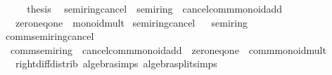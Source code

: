 \begin{isabellebody}
\ \ \isamarkupfalse%
\ \isamarkupfalse%
\ {\isacharquery}{\kern0pt}thesis\ \isacommand{{\isachardot}{\kern0pt}{\isachardot}{\kern0pt}}\isamarkupfalse%
\isanewline
{}\isamarkupfalse%
%
\endisatagproof
{\isafoldproof}%
%
\isadelimproof
\isanewline
%
\endisadelimproof
\isanewline
{}\isamarkupfalse%
\isanewline
\isanewline
{}\isamarkupfalse%
\ semiring{\isacharunderscore}{\kern0pt}{}{\isacharunderscore}{\kern0pt}cancel\ {\isacharequal}{\kern0pt}\ semiring\ {\isacharplus}{\kern0pt}\ cancel{\isacharunderscore}{\kern0pt}comm{\isacharunderscore}{\kern0pt}monoid{\isacharunderscore}{\kern0pt}add\isanewline
\ \ {\isacharplus}{\kern0pt}\ zero{\isacharunderscore}{\kern0pt}neq{\isacharunderscore}{\kern0pt}one\ {\isacharplus}{\kern0pt}\ monoid{\isacharunderscore}{\kern0pt}mult\isanewline
{}\isanewline
\isanewline
{}\isamarkupfalse%
\ semiring{\isacharunderscore}{\kern0pt}{}{\isacharunderscore}{\kern0pt}cancel%
\isadelimproof
\ %
\endisadelimproof
%
\isatagproof
\isacommand{{\isachardot}{\kern0pt}{\isachardot}{\kern0pt}}\isamarkupfalse%
%
\endisatagproof
{\isafoldproof}%
%
\isadelimproof
%
\endisadelimproof
\isanewline
\isanewline
{}\isamarkupfalse%
\ semiring{\isacharunderscore}{\kern0pt}{}%
\isadelimproof
\ %
\endisadelimproof
%
\isatagproof
\isacommand{{\isachardot}{\kern0pt}{\isachardot}{\kern0pt}}\isamarkupfalse%
%
\endisatagproof
{\isafoldproof}%
%
\isadelimproof
%
\endisadelimproof
\isanewline
\isanewline
{}\isamarkupfalse%
\isanewline
\isanewline
{}\isamarkupfalse%
\ comm{\isacharunderscore}{\kern0pt}semiring{\isacharunderscore}{\kern0pt}{}{\isacharunderscore}{\kern0pt}cancel\ {\isacharequal}{\kern0pt}\isanewline
\ \ comm{\isacharunderscore}{\kern0pt}semiring\ {\isacharplus}{\kern0pt}\ cancel{\isacharunderscore}{\kern0pt}comm{\isacharunderscore}{\kern0pt}monoid{\isacharunderscore}{\kern0pt}add\ {\isacharplus}{\kern0pt}\ zero{\isacharunderscore}{\kern0pt}neq{\isacharunderscore}{\kern0pt}one\ {\isacharplus}{\kern0pt}\ comm{\isacharunderscore}{\kern0pt}monoid{\isacharunderscore}{\kern0pt}mult\ {\isacharplus}{\kern0pt}\isanewline
\ \ \ right{\isacharunderscore}{\kern0pt}diff{\isacharunderscore}{\kern0pt}distrib{\isacharprime}{\kern0pt}\ {\isacharbrackleft}{\kern0pt}algebra{\isacharunderscore}{\kern0pt}simps{\isacharcomma}{\kern0pt}\ algebra{\isacharunderscore}{\kern0pt}split{\isacharunderscore}{\kern0pt}simps{\isacharbrackright}{\kern0pt}{\isacharcolon}{\kern0pt}\isanewline

\end{isabellebody}
